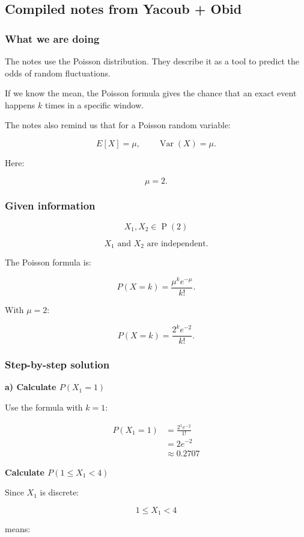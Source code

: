 \documentclass[10pt]{article}
\begin{document}
\subsection*{Compiled notes from Yacoub + Obid}

\subsubsection*{What we are doing}
The notes use the Poisson distribution.
They describe it as a tool to predict the odds of random
fluctuations.

If we know the mean, the Poisson formula gives the chance that
an exact event happens $k$ times in a specific window.

The notes also remind us that for a Poisson random variable:

\[
E[X]=\mu,
\qquad
\operatorname{Var}(X)=\mu.
\]

Here:

\[
\mu=2.
\]

\subsubsection*{Given information}
\[
X_1,X_2\in \operatorname{P}(2)
\]

\[
X_1 \text{ and } X_2
\text{ are independent.}
\]

The Poisson formula is:

\[
P(X=k)=
\frac{\mu^k e^{-\mu}}{k!}.
\]

With $\mu=2$:

\[
P(X=k)=
\frac{2^k e^{-2}}{k!}.
\]

\subsubsection*{Step-by-step solution}

\textbf{a) Calculate $P(X_1=1)$}

Use the formula with $k=1$:

\begin{align*}
P(X_1=1)
&=
\frac{2^1 e^{-2}}{1!} \\[2mm]
&=
2e^{-2} \\[2mm]
&\approx 0.2707
\end{align*}

\textbf{Calculate $P(1\leq X_1<4)$}

Since $X_1$ is discrete:

\[
1\leq X_1<4
\]

means:
\end{document}
